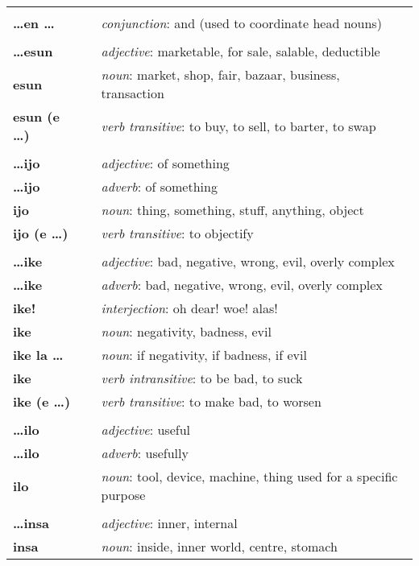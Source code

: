 \begin{supertabular}{p{2,5cm}|ll}
 && \\ %
\textbf{\dots en \dots} && \textit{conjunction}: and (used to coordinate head nouns) \\ 
 && \\ %
\textbf{\dots esun} && \textit{adjective}: marketable, for sale, salable, deductible \\  
\textbf{esun} && \textit{noun}: market, shop, fair, bazaar, business, transaction \\ 
\textbf{esun (e \dots)} && \textit{verb transitive}: to buy, to sell, to barter, to swap \\ 
 && \\ %
\textbf{\dots ijo} && \textit{adjective}: of something \\ 
\textbf{\dots ijo} && \textit{adverb}: of something \\ 
\textbf{ijo} && \textit{noun}: thing, something, stuff, anything, object \\ 
\textbf{ijo (e \dots)} && \textit{verb transitive}: to objectify \\ 
 && \\ %
\textbf{\dots ike} && \textit{adjective}: bad, negative, wrong, evil, overly complex \\ 
\textbf{\dots ike} && \textit{adverb}: bad, negative, wrong, evil, overly complex \\ 
\textbf{ike!} && \textit{interjection}: oh dear! woe! alas! \\ 
\textbf{ike} && \textit{noun}: negativity, badness, evil \\ 
\textbf{ike la \dots} && \textit{noun}: if negativity, if badness, if evil \\ 
\textbf{ike} && \textit{verb intransitive}: to be bad, to suck \\ 
\textbf{ike (e \dots)} && \textit{verb transitive}: to make bad, to worsen \\ 
 && \\ %
\textbf{\dots ilo} && \textit{adjective}: useful \\ 
\textbf{\dots ilo} && \textit{adverb}: usefully \\ 
\textbf{ilo} && \textit{noun}: tool, device, machine, thing used for a specific purpose \\ 
 && \\ %
\textbf{\dots insa} && \textit{adjective}: inner, internal \\ 
\textbf{insa} && \textit{noun}: inside, inner world, centre, stomach \\ 

\end{supertabular}
